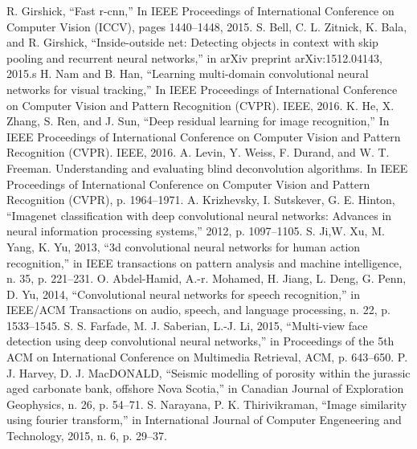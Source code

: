 \documentclass[conference,compsoc]{IEEEtran}
\begin{document}
\begin{thebibliography}{1}
		R. Girshick, ``Fast r-cnn,'' In IEEE Proceedings of International Conference on Computer Vision (ICCV), pages 1440–1448, 2015.
 			S. Bell, C. L. Zitnick, K. Bala, and R. Girshick, ``Inside-outside net: Detecting objects in context with skip pooling and recurrent neural networks,'' in arXiv preprint arXiv:1512.04143, 2015.s
			H. Nam and B. Han, ``Learning multi-domain convolutional neural networks for visual tracking,'' In IEEE Proceedings of International Conference on Computer Vision and Pattern Recognition (CVPR). IEEE, 2016.
			K. He, X. Zhang, S. Ren, and J. Sun, ``Deep residual learning for image recognition,'' In IEEE Proceedings of International Conference on Computer Vision and Pattern Recognition (CVPR). IEEE, 2016.
			A. Levin, Y. Weiss, F. Durand, and W. T. Freeman. Understanding and evaluating blind deconvolution algorithms. In IEEE Proceedings of International Conference on Computer Vision and Pattern Recognition (CVPR), p. 1964–1971.
		A. Krizhevsky, I. Sutskever, G. E. Hinton, ``Imagenet classification with deep convolutional neural networks: Advances in neural information processing systems,'' 2012, p. 1097–1105.
			S. Ji,W. Xu, M. Yang, K. Yu, 2013, ``3d convolutional neural networks for human action recognition,'' in IEEE transactions on pattern analysis and machine intelligence, n. 35, p. 221–231.
		O. Abdel-Hamid, A.-r. Mohamed, H. Jiang, L. Deng, G. Penn, D. Yu, 2014, ``Convolutional neural networks for speech recognition,'' in IEEE/ACM Transactions on audio, speech, and language processing, n. 22, p. 1533–1545.
		S. S. Farfade, M. J. Saberian, L.-J. Li, 2015, ``Multi-view face detection using deep convolutional neural networks,'' in Proceedings of the 5th ACM on International Conference on Multimedia Retrieval, ACM, p. 643–650.
 		P. J. Harvey, D. J. MacDONALD, ``Seismic modelling of porosity within the jurassic aged carbonate bank, offshore Nova Scotia,'' in  Canadian Journal of Exploration Geophysics, n. 26, p. 54–71.
		S. Narayana, P. K. Thirivikraman, ``Image similarity using fourier transform,'' in International Journal of Computer Engeneering and Technology, 2015, n. 6, p. 29–37.
\end{thebibliography}



\end{document}
